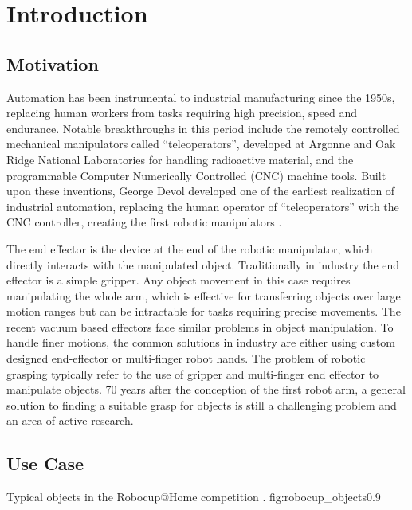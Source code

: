 \pagebreak
\section{Introduction}

\subsection{Motivation}
Automation has been instrumental to industrial manufacturing since the 1950s, replacing human workers from tasks
requiring high precision, speed and endurance. Notable breakthroughs in this period include the remotely controlled
mechanical manipulators called ``teleoperators'', developed at Argonne and Oak Ridge National Laboratories for handling
radioactive material, and the programmable Computer Numerically Controlled (CNC) machine tools. Built upon these
inventions, George Devol developed one of the earliest realization of industrial automation, replacing the human
operator of ``teleoperators'' with the CNC controller, creating the first robotic manipulators \cite{Murray1994}.

The end effector is the device at the end of the robotic manipulator, which directly interacts with the manipulated
object. Traditionally in industry the end effector is a simple gripper. Any object movement in this case requires
manipulating the whole arm, which is effective for transferring objects over large motion ranges but can be intractable
for tasks requiring precise movements. The recent vacuum based effectors face similar problems in object manipulation.
To handle finer motions, the common solutions in industry are either using custom designed end-effector or multi-finger
robot hands. The problem of robotic grasping typically refer to the use of gripper and multi-finger end effector to
manipulate objects. 70 years after the conception of the first robot arm, a general solution to finding a suitable grasp
for objects is still a challenging problem and an area of active research.

\subsection{Use Case}
{Typical objects in the Robocup@Home competition \cite{robocupRulebook2018}.}
{fig:robocup_objects}{0.9\textwidth}

